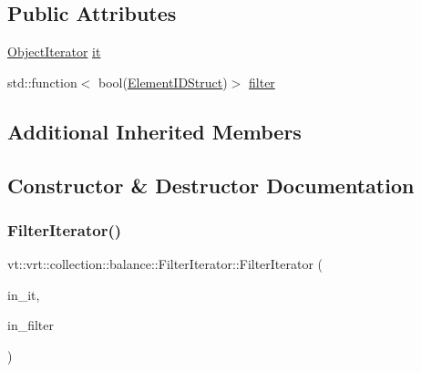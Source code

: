 \subsection*{Public Attributes}
\begin{DoxyCompactItemize}
\item 
\hyperlink{structvt_1_1vrt_1_1collection_1_1balance_1_1_object_iterator}{Object\+Iterator} \hyperlink{structvt_1_1vrt_1_1collection_1_1balance_1_1_filter_iterator_a908bc73f57f49c2f615119ac87b253a8}{it}
\item 
std\+::function$<$ bool(\hyperlink{namespacevt_1_1vrt_1_1collection_1_1balance_a9f5b53fafb270212279a4757d2c4cd28}{Element\+I\+D\+Struct})$>$ \hyperlink{structvt_1_1vrt_1_1collection_1_1balance_1_1_filter_iterator_a89d9841e7176310ab6c712643f88ead7}{filter}
\end{DoxyCompactItemize}
\subsection*{Additional Inherited Members}


\subsection{Constructor \& Destructor Documentation}
\mbox{\label{structvt_1_1vrt_1_1collection_1_1balance_1_1_filter_iterator_a42adc2e7e360cfe536246aec10814296}} 
\subsubsection{\texorpdfstring{Filter\+Iterator()}{FilterIterator()}}
{\footnotesize\ttfamily vt\+::vrt\+::collection\+::balance\+::\+Filter\+Iterator\+::\+Filter\+Iterator (\begin{DoxyParamCaption}\item[{\hyperlink{structvt_1_1vrt_1_1collection_1_1balance_1_1_object_iterator}{Object\+Iterator} \&\&}]{in\+\_\+it,  }\item[{std\+::function$<$ bool(\hyperlink{namespacevt_1_1vrt_1_1collection_1_1balance_a9f5b53fafb270212279a4757d2c4cd28}{Element\+I\+D\+Struct})$>$ \&\&}]{in\+\_\+filter }\end{DoxyParamCaption})\hspace{0.3cm}{\ttfamily [inline]}}



